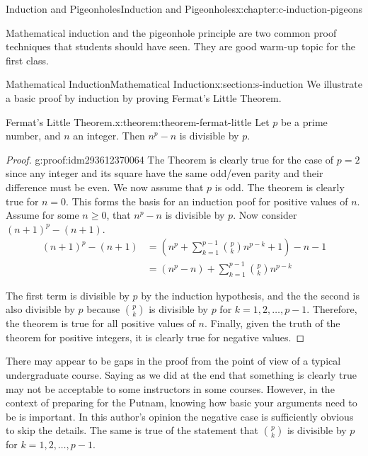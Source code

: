 \documentclass[twoside,10pt,]{book}
\numberwithin{equation}{section}
\newcommand{\amp}{&}
\begin{document}
\typeout{************************************************}
%
\begin{chapterptx}{Induction and Pigeonholes}{}{Induction and Pigeonholes}{}{}{x:chapter:c-induction-pigeons}
\begin{introduction}{}%
Mathematical induction and the pigeonhole principle are two common proof techniques that students should have seen.  They are good warm-up topic for the first class.%
\end{introduction}%
%
%
\typeout{************************************************}
\typeout{************************************************}
%
\begin{sectionptx}{Mathematical Induction}{}{Mathematical Induction}{}{}{x:section:s-induction}
%
We illustrate a basic proof by induction by proving Fermat's Little Theorem.%
\begin{theorem}{Fermat's Little Theorem.}{}{x:theorem:theorem-fermat-little}%
%
Let \(p\) be a prime number, and \(n\) an integer. Then \(n^p - n\) is divisible by \(p\).%
\end{theorem}
\begin{proof}{}{g:proof:idm293612370064}
The Theorem is clearly true for the case of \(p=2\) since any integer and its square have the same odd\slash{}even parity and their difference must be even.   We now assume that \(p\) is odd.   The theorem is clearly true for \(n=0\).  This forms the basis for an induction poof for positive values of \(n\).  Assume for some \(n \geq 0\), that  \(n^p - n\) is divisible by \(p\).  Now consider  \((n+1)^p - (n+1)\).%
\begin{align*}
(n+1)^p - (n+1) \amp=   \left( n^p+\sum_{k=1}^{p-1} { \binom{p}{k} n^{p-k} } + 1\right) -n -1 \\
\amp= (n^p -n)  +\sum_{k=1}^{p-1} {\binom{p}{k} n^{p-k} }
\end{align*}
%
\par
The first term is divisible by \(p\) by the induction hypothesis, and the the second is also divisible by \(p\) because \(\binom{p}{k}\) is divisible by \(p\) for \(k = 1, 2,\dots,p-1\).  Therefore, the theorem is true for all positive values of \(n\).  Finally, given the truth of the theorem for positive integers, it is clearly true for negative values.%
\end{proof}
There may appear to be gaps in the proof from the point of view of a typical undergraduate course. Saying as we did at the end that something is clearly true may not be acceptable to some instructors in some courses.  However, in the context of preparing for the Putnam, knowing how basic your arguments need to be is important.  In this author's opinion the negative case is sufficiently obvious to skip the details. The same is true of the statement that \(\binom{p}{k}\) is divisible by \(p\) for \(k = 1, 2,\dots,p-1\).%

\end{sectionptx}
\end{chapterptx}
\end{document}
